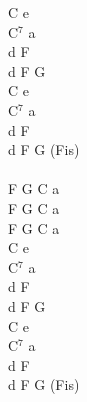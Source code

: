 \documentclass[a5paper, 10pt]{book}
\begin{document}
\begin{minipage}[t]{0.2\textwidth}
C e\\
C$^7$ a\\
d F\\
d F G\vspace*{2mm}
\\
C e\\
C$^7$ a\\
d F\\
d F G (Fis)\\
\\
F G C a\\
F G C a\\
F G C a\\

C e\\
C$^7$ a\\
d F\\
d F G\vspace*{2mm}
\\
C e\\
C$^7$ a\\
d F\\
d F G (Fis)\\
\\
\end{minipage}

\end{document}
